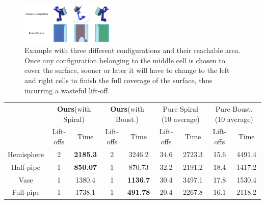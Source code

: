\documentclass[journal]{IEEEtran}
\begin{document}
\begin{figure}[tb]
\centering
\includegraphics[width = 0.4\textwidth]{figures/simu_exp/exp_pipe/three_example_pose}
\caption{Example with three different configurations and their reachable area. Once any configuration belonging to the middle cell is chosen to cover the surface, sooner or later it will have to change to the left and right cells to finish the full coverage of the surface, thus incurring a wasteful lift-off.}
\label{figthreeexamplepose}
\end{figure}

\begin{table}[t]
\centering
\begin{tabular}{|c|c|c|c|c|c|c|c|c|}
\hline
& \multicolumn{2}{c|}{\textbf{Ours}(with Spiral)} & \multicolumn{2}{c|}{\textbf{Ours}(with Boust.)} & \multicolumn{2}{c|}{Pure Spiral (10 average)} & \multicolumn{2}{c|}{Pure Boust. (10 average)}\\
\cline{2-9}
& Lift-offs & Time&Lift-offs & Time&Lift-offs & Time& Lift-offs & Time\\
\hline
\hline
Hemisphere &2&\textbf{2185.3}& 2 &3246.2 &34.6 &2723.3 &15.6 &4491.4\\
\hline
Half-pipe &1&\textbf{850.07}& 1 &870.73&32.2&2191.2&18.4&1417.2\\
\hline
Vase &1&1380.4& 1&\textbf{1136.7}&30.4&3497.1&17.8&1530.4\\
\hline
Full-pipe&1&1738.1&1&\textbf{491.78}&20.4&2267.8&16.1&2118.2\\
\hline
\end{tabular}
\end{table}



\end{document}

